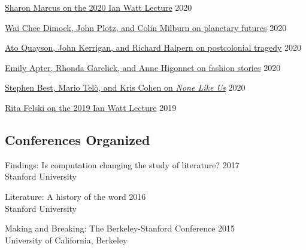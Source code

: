 \documentclass[
  12pt,
  letterpaper,
]{article}
\begin{document}
\href{https://web.archive.org/web/20220429093326/https://novel.stanford.edu/csn-cafe/2021/7/23/sharon-marcus-on-her-ian-watt-lecture-103020}{Sharon
Marcus on the 2020 Ian Watt Lecture} \hfill 2020

\href{https://web.archive.org/web/20220429010109/https://novel.stanford.edu/csn-cafe/2021/7/23/wai-chee-dimock-john-plotz-and-colin-milburn-on-the-literature-of-planetary-futures-52319}{Wai
Chee Dimock, John Plotz, and Colin Milburn on planetary futures}
\hfill 2020

\href{https://web.archive.org/web/20220429010041/https://novel.stanford.edu/csn-cafe/2021/7/23/ato-quayson-john-kerrigan-and-richard-halpern-on-postcolonial-tragedy-91519}{Ato
Quayson, John Kerrigan, and Richard Halpern on postcolonial tragedy}
\hfill 2020

\href{https://web.archive.org/web/20220429093237/https://novel.stanford.edu/csn-cafe/2021/7/23/fashion-stories-emily-apter-rhonda-garelick-and-anne-higonnet-on-the-cultural-history-of-clothing-1920}{Emily
Apter, Rhonda Garelick, and Anne Higonnet on fashion stories}
\hfill 2020

\href{https://web.archive.org/web/20220429093211/https://novel.stanford.edu/csn-cafe/2021/7/23/books-at-the-center-stephen-best-mario-tel-and-kris-cohen-on-none-like-us-101019}{Stephen
Best, Mario Telò, and Kris Cohen on \emph{None Like Us}} \hfill 2020

\href{https://web.archive.org/web/20220429093144/https://novel.stanford.edu/csn-cafe/2021/7/23/rita-felski-on-her-2019-ian-watt-lecture-5319}{Rita
Felski on the 2019 Ian Watt Lecture} \hfill 2019

\hypertarget{conferences-organized}{%
\subsection{Conferences Organized}\label{conferences-organized}}

Findings: Is computation changing the study of literature? \hfill 2017\\
\hspace*{0.333em} Stanford University

Literature: A history of the word \hfill 2016\\
\hspace*{0.333em} Stanford University

Making and Breaking: The Berkeley-Stanford Conference \hfill 2015\\
\hspace*{0.333em} University of California, Berkeley
\end{document}
